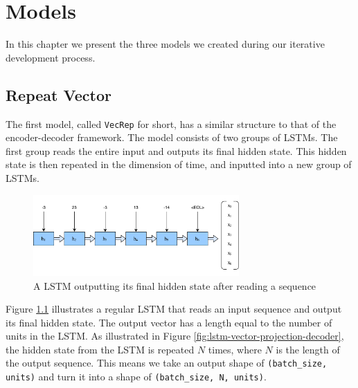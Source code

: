 
\chapter{Models}
\label{ch:models}
In this chapter we present the three models we created during our iterative development process.


\section{Repeat Vector}
The first model, called {\tt VecRep} for short, has a similar structure to that of the encoder-decoder framework. The model consists of two groups of LSTMs. The first group reads the entire input and outputs its final hidden state. This hidden state is then repeated in the dimension of time, and inputted into a new group of LSTMs.

\begin{figure}[ht]
    \centering
    \includegraphics[width=0.7\textwidth]{fig/development_process/lstm-vector-projection-encoder.pdf}
    \caption{A LSTM outputting its final hidden state after reading a sequence}
    \label{fig:lstm-vector-projection-encoder}
\end{figure}

Figure \ref{fig:lstm-vector-projection-encoder} illustrates a regular LSTM that reads an input sequence and output its final hidden state. The output vector has a length equal to the number of units in the LSTM. As illustrated in Figure \ref{fig:lstm-vector-projection-decoder}, the hidden state from the LSTM is repeated \(N\) times, where \(N\) is the length of the output sequence. This means we take an output shape of {\tt (batch\_size, units)} and turn it into a shape of {\tt (batch\_size, N, units)}.

